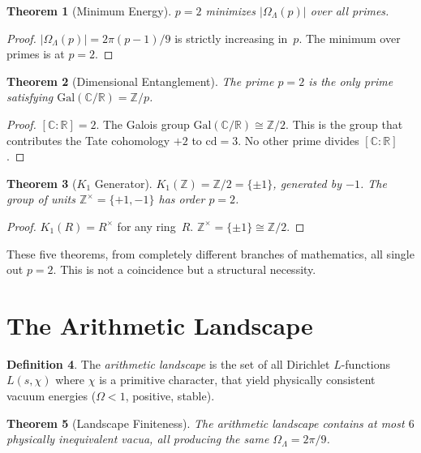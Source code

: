 \documentclass[12pt,a4paper]{article}
\newtheorem{theorem}{Theorem}[section]
\theoremstyle{definition}
\newtheorem{definition}[theorem]{Definition}
\newcommand{\cd}{\mathrm{cd}}
\newcommand{\Gal}{\mathrm{Gal}}
\newcommand{\Z}{\mathbb{Z}}
\newcommand{\R}{\mathbb{R}}
\newcommand{\C}{\mathbb{C}}
\newcommand{\OmL}{\Omega_\Lambda}
\begin{document}
\begin{theorem}[Minimum Energy]\label{thm:min}
$p=2$ minimizes $|\Omega_\Lambda(p)|$ over all primes.
\end{theorem}

\begin{proof}
$|\Omega_\Lambda(p)|=2\pi(p-1)/9$ is strictly increasing in~$p$.
The minimum over primes is at $p=2$.
\end{proof}

\begin{theorem}[Dimensional Entanglement]\label{thm:dim}
The prime $p=2$ is the only prime satisfying $\Gal(\C/\R)=\Z/p$.
\end{theorem}

\begin{proof}
$[\C:\R]=2$.  The Galois group $\Gal(\C/\R)\cong\Z/2$.
This is the group that contributes the Tate cohomology $+2$ to $\cd=3$.
No other prime divides $[\C:\R]$.
\end{proof}

\begin{theorem}[$K_1$ Generator]\label{thm:K1}
$K_1(\Z)=\Z/2=\{\pm 1\}$, generated by $-1$.  The group of units
$\Z^\times=\{+1,-1\}$ has order $p=2$.
\end{theorem}

\begin{proof}
$K_1(R)=R^\times$ for any ring~$R$.  $\Z^\times=\{\pm 1\}\cong\Z/2$.
\end{proof}

These five theorems, from completely different branches of mathematics,
all single out $p=2$.  This is not a coincidence but a structural necessity.

\section{The Arithmetic Landscape}\label{sec:landscape}

\begin{definition}
The \emph{arithmetic landscape} is the set of all Dirichlet $L$-functions
$L(s,\chi)$ where $\chi$ is a primitive character, that yield physically
consistent vacuum energies ($\Omega<1$, positive, stable).
\end{definition}

\begin{theorem}[Landscape Finiteness]\label{thm:landscape}
The arithmetic landscape contains at most $6$ physically inequivalent vacua,
all producing the same $\OmL=2\pi/9$.
\end{theorem}
\end{document}
